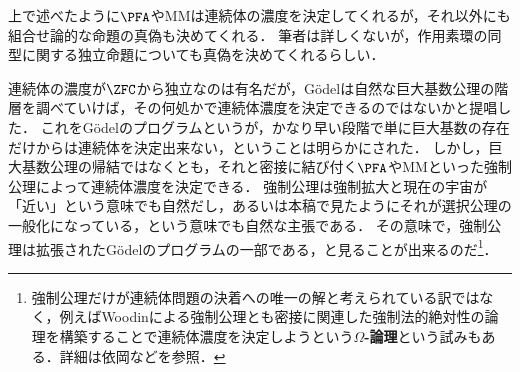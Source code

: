 \documentclass[a4j,leqno]{ltjsarticle}
\renewcommand{\emph}[1]{\textbf{\textsf{#1}}}
\newcommand{\MM}{\mathrm{MM}}
\begin{document}
上で述べたように$\PFA$や$\MM$は連続体の濃度を決定してくれるが，それ以外にも組合せ論的な命題の真偽も決めてくれる．
筆者は詳しくないが，作用素環の同型に関する独立命題についても真偽を決めてくれるらしい．

連続体の濃度が$\ZFC$から独立なのは有名だが，G\"{o}delは自然な巨大基数公理の階層を調べていけば，その何処かで連続体濃度を決定できるのではないかと提唱した．
これをG\"{o}delのプログラムというが，かなり早い段階で単に巨大基数の存在だけからは連続体を決定出来ない，ということは明らかにされた．
しかし，巨大基数公理の帰結ではなくとも，それと密接に結び付く$\PFA$や$\MM$といった強制公理によって連続体濃度を決定できる．
強制公理は強制拡大と現在の宇宙が「近い」という意味でも自然だし，あるいは本稿で見たようにそれが選択公理の一般化になっている，という意味でも自然な主張である．
その意味で，強制公理は拡張されたG\"{o}delのプログラムの一部である，と見ることが出来るのだ\footnote{強制公理だけが連続体問題の決着への唯一の解と考えられている訳ではなく，例えばWoodinによる強制公理とも密接に関連した強制法的絶対性の論理を構築することで連続体濃度を決定しようという\emph{$\Omega$-論理}という試みもある．詳細は依岡\cite{Yorioka:2009}などを参照．}．

\nocite{alg-d,Jech:1997ai,Kunen:2011,Yorioka:2009}
\nocite{Lauri:2016rw}
\printbibliography[title=参考文献]
\end{document}
